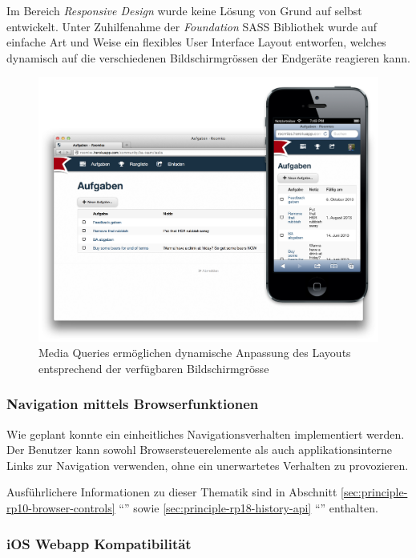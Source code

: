 Im Bereich \emph{Responsive Design} wurde keine Lösung von Grund auf selbst entwickelt. Unter Zuhilfenahme der \emph{Foundation} SASS Bibliothek \cite{Foundation} wurde auf einfache Art und Weise ein flexibles User Interface Layout entworfen, welches dynamisch auf die verschiedenen Bildschirmgrössen der Endgeräte reagieren kann.

\begin{figure}[H]
	\centering
	\includegraphics[width=12cm]{content/principle-demonstration/images/responsive-screenshots.png}
	\caption{Media Queries ermöglichen dynamische Anpassung des Layouts entsprechend der verfügbaren Bildschirmgrösse}
	\label{fig:responsive-screenshots}
\end{figure}


\subsubsection*{Navigation mittels Browserfunktionen}

Wie geplant konnte ein einheitliches Navigationsverhalten implementiert werden. Der Benutzer kann sowohl Browsersteuerelemente als auch applikationsinterne Links zur Navigation verwenden, ohne ein unerwartetes Verhalten zu provozieren.

Ausführlichere Informationen zu dieser Thematik sind in Abschnitt \ref{sec:principle-rp10-browser-controls} ``'' sowie \ref{sec:principle-rp18-history-api} ``'' enthalten.


\subsubsection*{iOS Webapp Kompatibilität}

